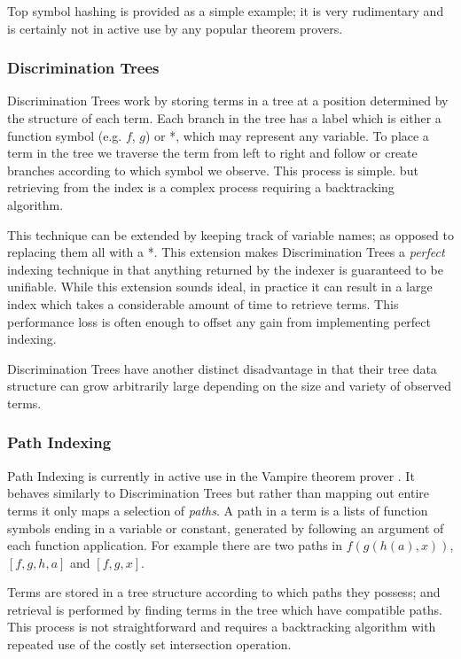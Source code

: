Top symbol hashing is provided as a simple example; it is very rudimentary and
is certainly not in active use by any popular theorem provers.

\subsubsection{Discrimination Trees}

Discrimination Trees work by storing terms in a tree at a position determined by the structure
of each term. Each branch in the tree has a label which is either a function symbol
(e.g. $f$, $g$) or *, which may represent any variable. To place a term in the tree
we traverse the term from left to right and follow or create branches according to
which symbol we observe. This process is simple. but retrieving from the index is a
complex process requiring a backtracking algorithm.

This technique can be extended by keeping track of variable names; as opposed to
replacing them all with a *. This extension makes Discrimination Trees a \emph{perfect} indexing technique in that anything
returned by the indexer is guaranteed to be unifiable\cite{mccune}. While this extension sounds
ideal, in practice it can result in a large index which takes
a considerable amount of time to retrieve terms. This performance
loss is often enough to offset any gain from implementing perfect indexing.

Discrimination Trees have another distinct disadvantage in that their tree data
structure can grow arbitrarily large depending on the size and variety of observed terms.

\subsubsection{Path Indexing}

Path Indexing is currently in active use in the Vampire theorem prover \cite{vampire}.
It behaves similarly to Discrimination Trees but rather than mapping out entire terms
it only maps a selection of \emph{paths}. A path in a term is a lists of function symbols
ending in a variable or constant, generated by following an argument of each function application.
For example there are two paths in $f(g(h(a), x))$, $[f, g, h, a]$ and $[f,g,x]$.

Terms are stored in a tree structure according to which paths they possess; and retrieval
is performed by finding terms in the tree which have compatible paths. This process
is not straightforward and requires a backtracking algorithm with repeated use of
the costly set intersection operation.

